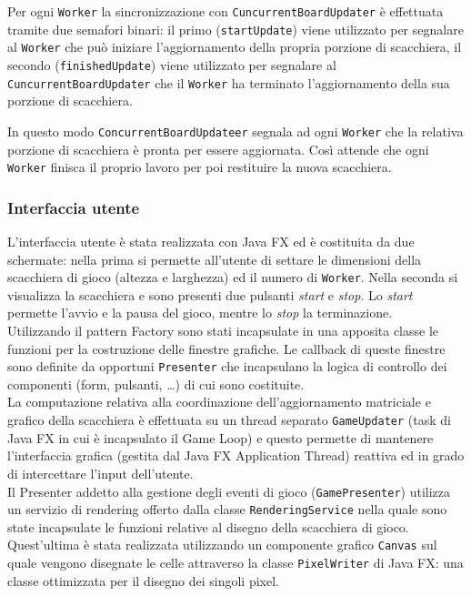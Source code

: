 \documentclass[a4paper]{article}
\begin{document}
Per ogni \texttt{Worker} la sincronizzazione con \texttt{CuncurrentBoardUpdater} è effettuata tramite due semafori binari: il primo (\texttt{startUpdate}) viene utilizzato per segnalare al \texttt{Worker} che può iniziare l'aggiornamento della propria porzione di scacchiera, il secondo (\texttt{finishedUpdate}) viene utilizzato per segnalare al \texttt{CuncurrentBoardUpdater} che il \texttt{Worker} ha terminato l'aggiornamento della sua porzione di scacchiera.

In questo modo \texttt{ConcurrentBoardUpdateer} segnala ad ogni \texttt{Worker} che la relativa porzione di scacchiera è pronta per essere aggiornata. Così attende che ogni \texttt{Worker} finisca il proprio lavoro per poi restituire la nuova scacchiera.

\subsubsection{Interfaccia utente}\label{interfaccia-utente}

L’interfaccia utente è stata realizzata con Java FX ed è costituita da due schermate: nella prima si permette all’utente di settare le dimensioni della scacchiera di gioco (altezza e larghezza) ed il numero di \texttt{Worker}. Nella seconda si visualizza la scacchiera e sono presenti due pulsanti \textit{start} e \textit{stop}. Lo \textit{start} permette l’avvio e la pausa del gioco, mentre lo \textit{stop} la terminazione.\\
Utilizzando il pattern Factory sono stati incapsulate in una apposita classe le funzioni per la costruzione delle finestre grafiche. Le callback di queste finestre sono definite da opportuni \texttt{Presenter} che incapsulano la logica di controllo dei componenti (form, pulsanti, …) di cui sono costituite.\\
La computazione relativa alla coordinazione dell’aggiornamento matriciale e grafico della scacchiera è effettuata su un thread separato \texttt{GameUpdater} (task di Java FX in cui è incapsulato il Game Loop) e questo permette di mantenere l’interfaccia grafica (gestita dal Java FX Application Thread) reattiva ed in grado di intercettare l’input dell’utente.\\
Il Presenter addetto alla gestione degli eventi di gioco (\texttt{GamePresenter}) utilizza un servizio di rendering offerto dalla  classe \texttt{RenderingService} nella quale sono state incapsulate le funzioni relative al disegno della scacchiera di gioco.
Quest'ultima è stata realizzata utilizzando un componente grafico \texttt{Canvas} sul quale vengono disegnate le celle attraverso la classe \texttt{PixelWriter} di Java FX: una classe ottimizzata per il disegno dei singoli pixel.
\end{document}
